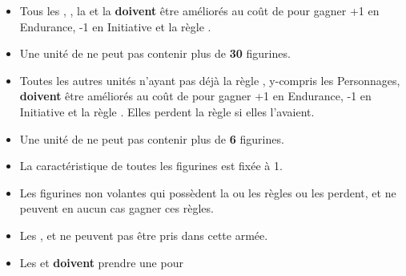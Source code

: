 \begin{multicols}{2}\raggedcolumns

\begin{center}\armynewsubsection{\commanderoftheterracottaarmy}\end{center} %

\begin{itemize}[label={-}, leftmargin=*]
\item Tous les \skeletons{}, \skeletonarchers{}, la \skeletoncavalry{} et la \necropolisguard{} \textbf{doivent} être améliorés au coût de \permodel{} pour gagner +1 en Endurance, -1 en Initiative et la règle \undeadconstruct{}.

\item Une unité de \necropolisguard{} ne peut pas contenir plus de \textbf{30} figurines.

\item Toutes les autres unités n'ayant pas déjà la règle \undeadconstruct{}, y-compris les Personnages, \textbf{doivent} être améliorés au coût de \permodel{} pour gagner +1 en Endurance, -1 en Initiative et la règle \undeadconstruct{}. Elles perdent la règle \flammable{} si elles l'avaient.

\item Une unité de \skeletonchariots{} ne peut pas contenir plus de \textbf{6} figurines.

\item La caractéristique \risen{} de toutes les figurines est fixée à 1.

\item Les figurines non volantes qui possèdent la ou les règles \undergroundambush{} ou \lighttroops{} les perdent, et ne peuvent en aucun cas gagner ces règles.

\item Les \greatvultures{}, \scarabswarms{} et \wingedreapers{} ne peuvent pas être pris dans cette armée.
\end{itemize}

\vspace*{\fill}\columnbreak

\begin{center}\armynewsubsection{\lordofthebarrowlegion}\end{center}

\begin{itemize}[label={-}, leftmargin=*]
\item Les \skeletons{} et \skeletonarchers{} \textbf{doivent} prendre une \ha{} pour \permodel{}


\end{itemize}
\end{multicols}
